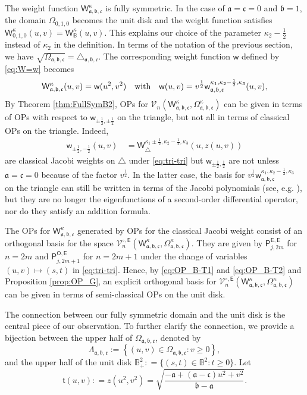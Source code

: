 \documentclass{amsart}
\theoremstyle{remark}
\def\sw{{\mathsf w}}
\def\sE{{\mathsf E}}
\def\sO{{\mathsf O}}
\def\sP{{\mathsf P}}
\def\sW{{\mathsf W}}
\def\fa{{\mathfrak a}}
\def\fb{{\mathfrak b}}
\def\fc{{\mathfrak c}}
\def\ft{{\mathfrak t}}
\def\k{{\kappa}}
\def\CV{{\mathcal V}}
\def\BB{{\mathbb B}}
\def\f{\frac}
\begin{document}
The weight function $\sW_{\fa,\fb,\fc}^\k$ is fully symmetric. In the case of $\fa =\fc = 0$ and $\fb=1$, the 
domain $\Omega_{0,1, 0}$ becomes the unit disk and the weight function satisfies $\sW_{0,1,0}^\k(u,v) = \sW_\BB^\k(u,v)$. 
This explains our choice of the parameter $\k_2 -\f12$ instead of $\k_2$ in the definition. 
In terms of the notation of the previous section, we have $\sqrt{\Omega_{\fa,\fb,\fc}} = \triangle_{\fa,\fb,\fc}$. The 
corresponding weight function $\sw$ defined by \eqref{eq:W=w} becomes
\begin{equation} \label{eq:sWabc}
    \sW_{\fa,\fb,\fc}^\k(u,v) = \sw(u^2,v^2) \quad\hbox{with} \quad \sw(u,v)  = v^{\f12} \sw_{\fa,\fb,\fc}^{\k_1,\k_2-\f12, \k_3} (u,v),  
\end{equation}
By Theorem \ref{thm:FullSymB2}, OPs for $\CV_n(\sW_{\fa,\fb,\fc}^\k, \Omega_{\fa,\fb,\fc}^\k)$ can be given 
in terms of OPs with respect to $\sw_{\pm \f12, \pm\f12}$ on the triangle, but not all in terms of classical OPs 
on the triangle. Indeed, 
\begin{align*}
  \sw_{\pm \f12, - \f12}(u,v) \,& = \sW_\triangle^{\k_1 \pm \f12, \k_2-\f12, \k_3}\left(u, z(u,v) \right)
\end{align*}
are classical Jacobi weights on $\triangle$ under \eqref{eq:tri-tri} but $\sw_{\pm \f12, \f12}$ are not unless $\fa = \fc = 0$
because of the factor $v^\f12$. In the latter case, the basis for $v^{\f12} \sw_{\fa,\fb,\fc}^{\k_1,\k_2-\f12, \k_3}$ 
on the triangle can still be written in terms of the Jacobi polynomials (see, e.g. \cite{OTV}), but they are no 
longer the eigenfunctions of a second-order differential operator, nor do they satisfy an addition formula.  

The OPs for $\sW_{\fa,\fb,\fc}^\k$ generated by OPs for the classical Jacobi weight consist of an orthogonal basis 
for the space $\CV_n^{\circ, \sE}(\sW_{\fa,\fb,\fc}^\k, \Omega_{\fa,\fb,\fc}^\k)$. They are given by 
$\sP_{j,2m}^{\sE,\sE}$ for $n = 2m$ and $\sP_{j, 2m+1}^{\sO,\sE}$ for $n = 2m+1$ under the change of variables 
$(u,v) \mapsto (s,t)$ in \eqref{eq:tri-tri}. Hence, by \eqref{eq:OP_B-T1} and \eqref{eq:OP_B-T2} and 
Proposition \ref{prop:OP_G}, an explicit orthogonal basis for $\CV_n^{\circ, \sE}(\sW_{\fa,\fb,\fc}^\k, \Omega_{\fa,\fb,\fc}^\k)$
can be given in terms of semi-classical OPs on the unit disk. 

The connection between our fully symmetric domain and the unit disk is the central piece of our observation. 
To further clarify the connection, we provide a bijection between the upper half of $ \Omega_{\fa,\fb,\fc}$, denoted by
$$
    \Lambda_{\fa,\fb,\fc} := \left \{(u,v) \in \Omega_{\fa,\fb,\fc}: v \ge 0\right\},
$$
and the upper half of the unit disk $\BB_+^2: = \{(s,t) \in \BB^2: t \ge 0\}$. Let 
\begin{equation} \label{eq:tuv}
  \ft(u,v): = z(u^2,v^2) = \sqrt{\frac{-\fa+(\fa-\fc)u^2+v^2}{\fb-\fa}}. 
\end{equation}
\end{document}
